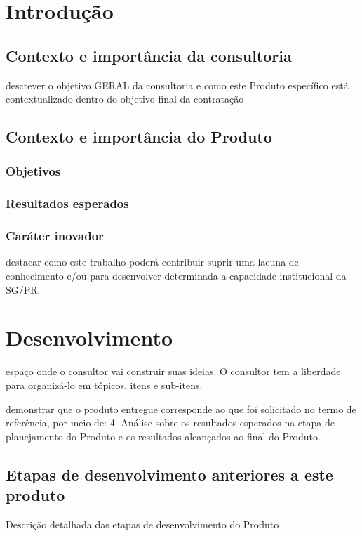 \documentclass[12pt]{article}
\newcommand{\PalavrasChave}{reconhecimento de padrões, redes complexas, processamento de linguagem natural, web semântica, participação social}
\begin{document}



\tableofcontents
\newpage


\begin{abstract}
Este documento descreve o quinto produto.

{\bf Palavras-chave:} \PalavrasChave.
\end{abstract}
\newpage

\section{Introdução}
\subsection{Contexto e importância da consultoria}
descrever o objetivo GERAL da consultoria e como este Produto específico está contextualizado dentro do objetivo final da contratação
\subsection{Contexto e importância do Produto}
\subsubsection{Objetivos}
\subsubsection{Resultados esperados}
\subsubsection{Caráter inovador}
destacar como este trabalho poderá contribuir suprir uma lacuna de conhecimento e/ou para desenvolver determinada a capacidade institucional da SG/PR.
\section{Desenvolvimento}\label{sec:dev}
espaço onde o consultor vai construir suas ideias. O consultor tem a liberdade para organizá-lo em tópicos, itens e sub-itens. 

demonstrar que o produto entregue corresponde ao que foi solicitado no termo de referência, por meio de:
4. Análise sobre os resultados esperados na etapa de planejamento do Produto e os resultados alcançados ao final do Produto.

\subsection{Etapas de desenvolvimento anteriores a este produto}
Descrição detalhada das etapas de desenvolvimento do Produto
\end{document}
